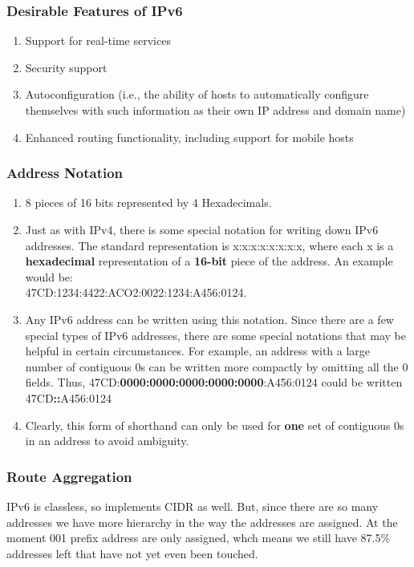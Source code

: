 \documentclass[11pt, a4paper]{article}
\begin{document}
\subsubsection{Desirable Features of IPv6}
\begin{enumerate}
    \item Support for real-time services
    \item Security support
    \item Autoconfiguration (i.e., the ability of hosts to automatically configure themselves with such information as their own IP address and domain name)
    \item Enhanced routing functionality, including support for mobile hosts
\end{enumerate}

\subsubsection{Address Notation}
\begin{enumerate}
    \item 8 pieces of 16 bits represented by 4 Hexadecimals.
    \item Just as with IPv4, there is some special notation for writing down IPv6 addresses. The standard representation is x:x:x:x:x:x:x:x, where each x is a \textbf{hexadecimal} representation of a \textbf{16-bit} piece of the address. An example would be: \\47CD:1234:4422:ACO2:0022:1234:A456:0124.
    \item Any IPv6 address can be written using this notation. Since there are a few special types of IPv6 addresses, there are some special notations that may be helpful in certain circumstances. For example, an address with a large number of contiguous 0s can be written more compactly by omitting all the 0 fields. Thus, 47CD:\textbf{0000:0000:0000:0000:0000}:A456:0124 could be written 47CD\textbf{::}A456:0124
    \item Clearly, this form of shorthand can only be used for \textbf{one} set of contiguous 0s in an address to avoid ambiguity.
\end{enumerate}

\subsubsection{Route Aggregation}
IPv6 is classless, so implements CIDR as well. But, since there are so many addresses we have more hierarchy in the way the addresses are assigned. At the moment 001 prefix address are only assigned, whch means we still have 87.5\% addresses left that have not yet even been touched.
\end{document}
